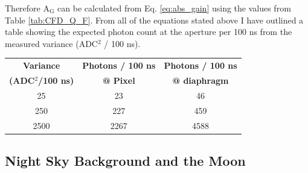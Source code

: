 Therefore A$_{\mathrm{G}}$ can be calculated from Eq. \ref{eq:abs_gain} using the values from Table \ref{tab:CFD_Q_F}. From all of the equations stated above I have outlined a table showing the expected photon count at the aperture per 100 ns from the measured variance (ADC$^2$ / 100 ns).
\begin{center}
\begin{tabular}{| c | c | c | }
\hline \hline
\textbf{Variance} & \textbf{Photons / 100 ns} & \textbf{Photons / 100 ns} \\
\textbf{(ADC$^2$/100 ns)} & \textbf{@ Pixel} & \textbf{@ diaphragm} \\
\hline \hline
25  & 23 & 46 \\
\hline
250  & 227 & 459 \\
\hline
2500  & 2267 & 4588 \\
\hline
\end{tabular}
\end{center}

\subsection{Night Sky Background and the Moon}

